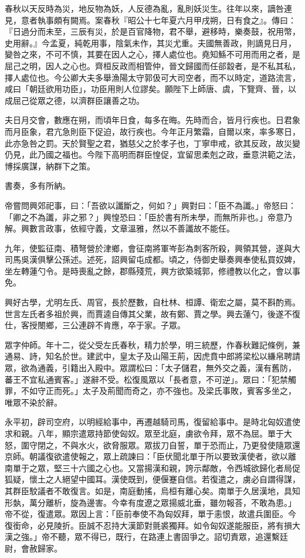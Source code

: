 \begin{pinyinscope}
春秋以天反時為災，地反物為妖，人反德為亂，亂則妖災生。往年以來，謫咎連見，意者執事頗有闕焉。案春秋『昭公十七年夏六月甲戌朔，日有食之』。傳曰：『日過分而未至，三辰有災，於是百官降物，君不舉，避移時，樂奏鼓，祝用幣，史用辭。』今孟夏，純乾用事，陰氣未作，其災尤重。夫國無善政，則謫見日月，變咎之來，不可不慎，其要在因人之心，擇人處位也。堯知鯀不可用而用之者，是屈己之明，因人之心也。齊桓反政而相管仲，晉文歸國而任郤縠者，是不私其私，擇人處位也。今公卿大夫多舉漁陽太守郭伋可大司空者，而不以時定，道路流言，咸曰「朝廷欲用功臣」，功臣用則人位謬矣。願陛下上師唐、虞，下覽齊、晉，以成屈己從眾之德，以濟群臣讓善之功。

夫日月交會，數應在朔，而頃年日食，每多在晦。先時而合，皆月行疾也。日君象而月臣象，君亢急則臣下促迫，故行疾也。今年正月繁霜，自爾以來，率多寒日，此亦急咎之罰。天於賢聖之君，猶慈父之於孝子也，丁寧申戒，欲其反政，故災變仍見，此乃國之福也。今陛下高明而群臣惶促，宜留思柔剋之政，垂意洪範之法，博採廣謀，納群下之策。

書奏，多有所納。

帝嘗問興郊祀事，曰：「吾欲以讖斷之，何如？」興對曰：「臣不為讖。」帝怒曰：「卿之不為讖，非之邪？」興惶恐曰：「臣於書有所未學，而無所非也。」帝意乃解。興數言政事，依經守義，文章溫雅，然以不善讖故不能任。

九年，使監征南、積弩營於津鄉，會征南將軍岑彭為刺客所殺，興領其營，遂與大司馬吳漢俱擊公孫述。述死，詔興留屯成都。頃之，侍御史舉奏興奉使私買奴婢，坐左轉蓮勺令。是時喪亂之餘，郡縣殘荒，興方欲築城郭，修禮教以化之，會以事免。

興好古學，尤明左氏、周官，長於歷數，自杜林、桓譚、衛宏之屬，莫不斟酌焉。世言左氏者多祖於興，而賈逵自傳其父業，故有鄭、賈之學。興去蓮勺，後遂不復仕，客授閿鄉，三公連辟不肯應，卒于家。子眾。

眾字仲師。年十二，從父受左氏春秋，精力於學，明三統歷，作春秋難記條例，兼通易、詩，知名於世。建武中，皇太子及山陽王荊，因虎賁中郎將梁松以縑帛聘請眾，欲為通義，引籍出入殿中。眾謂松曰：「太子儲君，無外交之義，漢有舊防，蕃王不宜私通賓客。」遂辭不受。松復風眾以「長者意，不可逆」。眾曰：「犯禁觸罪，不如守正而死。」太子及荊聞而奇之，亦不強也。及梁氏事敗，賓客多坐之，唯眾不染於辭。

永平初，辟司空府，以明經給事中，再遷越騎司馬，復留給事中。是時北匈奴遣使求和親。八年，顯宗遣眾持節使匈奴。眾至北庭，虜欲令拜，眾不為屈。單于大怒，圍守閉之，不與水火，欲脅服眾。眾拔刀自誓，單于恐而止，乃更發使隨眾還京師。朝議復欲遣使報之，眾上疏諫曰：「臣伏聞北單于所以要致漢使者，欲以離南單于之眾，堅三十六國之心也。又當揚漢和親，誇示鄰敵，令西城欲歸化者局促狐疑，懷土之人絕望中國耳。漢使既到，便偃蹇自信。若復遣之，虜必自謂得謀，其群臣駮議者不敢復言。如是，南庭動搖，烏桓有離心矣。南單于久居漢地，具知形埶，萬分離析，旋為邊害。今幸有度遼之眾揚威北垂，雖勿報荅，不敢為患。」帝不從，復遣眾。眾因上言：「臣前奉使不為匈奴拜，單于恚恨，故遣兵圍臣。今復銜命，必見陵折。臣誠不忍持大漢節對氈裘獨拜。如令匈奴遂能服臣，將有損大漢之強。」帝不聽，眾不得已，既行，在路連上書固爭之。詔切責眾，追還繫廷尉，會赦歸家。


\end{pinyinscope}
